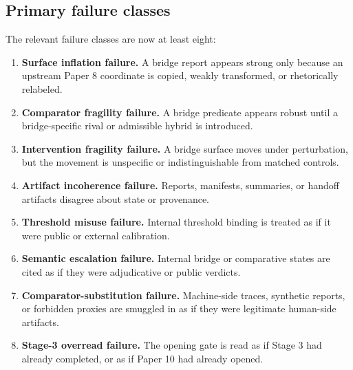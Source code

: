 \documentclass[11pt,a4paper]{article}
\theoremstyle{definition}
\begin{document}
\subsection{Primary failure classes}
The relevant failure classes are now at least eight:
\begin{enumerate}[leftmargin=1.5em]
\item \textbf{Surface inflation failure.} A bridge report appears strong only because an upstream Paper 8 coordinate is copied, weakly transformed, or rhetorically relabeled.
\item \textbf{Comparator fragility failure.} A bridge predicate appears robust until a bridge-specific rival or admissible hybrid is introduced.
\item \textbf{Intervention fragility failure.} A bridge surface moves under perturbation, but the movement is unspecific or indistinguishable from matched controls.
\item \textbf{Artifact incoherence failure.} Reports, manifests, summaries, or handoff artifacts disagree about state or provenance.
\item \textbf{Threshold misuse failure.} Internal threshold binding is treated as if it were public or external calibration.
\item \textbf{Semantic escalation failure.} Internal bridge or comparative states are cited as if they were adjudicative or public verdicts.
\item \textbf{Comparator-substitution failure.} Machine-side traces, synthetic reports, or forbidden proxies are smuggled in as if they were legitimate human-side artifacts.
\item \textbf{Stage-3 overread failure.} The opening gate is read as if Stage 3 had already completed, or as if Paper 10 had already opened.
\end{enumerate}
\end{document}
